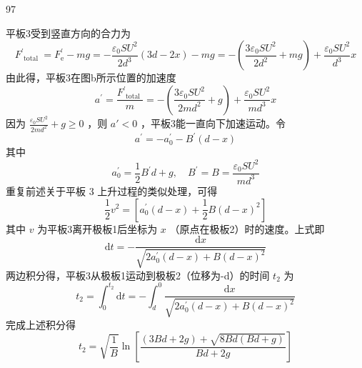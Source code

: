 \begin{solution}{97}
\begin{subsolution}
\begin{equation}
            \label{eq:16.p97}
        \end{equation}
        平板3受到竖直方向的合力为
        \begin{equation*}
            F _ {\text { total }} ^ {\prime} = F _ {\mathrm{e}} ^ {\prime} - m g = - \frac {\varepsilon_ {0} S U ^ {2}}{2 d ^ {3}} (3 d - 2 x) - m g = - \left(\frac {3 \varepsilon_ {0} S U ^ {2}}{2 d ^ {2}} + m g\right) + \frac {\varepsilon_ {0} S U ^ {2}}{d ^ {3}} x
        \end{equation*}
        由此得，平板3在图b所示位置的加速度
        \begin{equation}
            a ^ {\prime} = \frac {F _ {\text { total }} ^ {\prime}}{m} = - \left(\frac {3 \varepsilon_ {0} S U ^ {2}}{2 m d ^ {2}} + g\right) + \frac {\varepsilon_ {0} S U ^ {2}}{m d ^ {3}} x
            \label{eq:17.p97}
        \end{equation}
        因为 $\frac{\varepsilon_0SU^2}{2md^2} + g \geq 0$ ，则 $a' < 0$ ，平板3能一直向下加速运动。令
        \begin{equation*}
            a ^ {\prime} = - a _ {0} ^ {\prime} - B ^ {\prime} (d - x)
        \end{equation*}
        其中
        \begin{equation*}
            a _ {0} ^ {\prime} = \frac {1}{2} B ^ {\prime} d + g, \quad B ^ {\prime} = B = \frac {\varepsilon_ {0} S U ^ {2}}{m d ^ {3}}
        \end{equation*}
        重复前述关于平板 3 上升过程的类似处理，可得
        \begin{equation*}
            \frac {1}{2} v ^ {2} = \left[ a _ {0} ^ {\prime} (d - x) + \frac {1}{2} B (d - x) ^ {2} \right]
        \end{equation*}
        其中 $v$ 为平板3离开极板1后坐标为 $x$ （原点在极板2）时的速度。上式即
        \begin{equation}
            \mathrm{d} t = - \frac {\mathrm{d} x}{\sqrt {2 a _ {0} ^ {\prime} (d - x) + B (d - x) ^ {2}}}
            \label{eq:18.p97}
        \end{equation}
        两边积分得，平板3从极板1运动到极板2（位移为-d）的时间 $t_{2}$ 为
        \begin{equation*}
            t _ {2} = \int_ {0} ^ {t _ {2}} \mathrm{d} t = - \int_ {d} ^ {0} \frac {\mathrm{d} x}{\sqrt {2 a _ {0} ^ {\prime} (d - x) + B (d - x) ^ {2}}}
        \end{equation*}
        完成上述积分得
        \begin{equation*}
            t _ {2} = \sqrt {\frac {1}{B}} \ln \left[ \frac {(3 B d + 2 g) + \sqrt {8 B d (B d + g)}}{B d + 2 g} \right]

\end{equation*}
\end{subsolution}
\end{solution}
